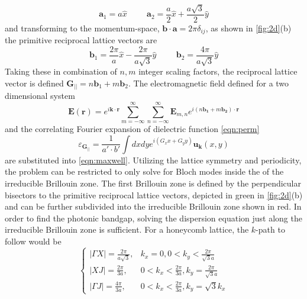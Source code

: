 \begin{equation}
	\boldsymbol{a}_1 = a\hat{x} \hspace{1cm} \boldsymbol{a}_2 = \frac{a}{2}\hat{x}+\frac{a\sqrt{3}}{2}\hat{y}
\end{equation}
and transforming to the momentum-space,  $\boldsymbol{b}\cdot\boldsymbol{a} = 2\pi\delta_{ij}$, as shown in \ref{fig:2d}(b) the primitive reciprocal lattice vectors are
\begin{equation}
	\boldsymbol{b}_1 = \frac{2\pi}{a}\hat{x}-\frac{2\pi}{a\sqrt{3}}\hat{y} \hspace{1cm} \boldsymbol{b}_2 =\frac{4\pi}{a\sqrt{3}}\hat{y} 
\end{equation}
Taking these in combination of $n, m$ integer scaling factors, the reciprocal lattice vector is defined $\boldsymbol{G_{||}} = n\boldsymbol{b}_1 + m\boldsymbol{b}_2$. 
The electromagnetic field defined for a two dimensional system
\begin{equation}
	\boldsymbol{E}(\boldsymbol{r}) = e^{i\boldsymbol{k}\cdot\boldsymbol{r}}
	\sum_{m=-\infty}^\infty\sum_{n=-\infty}^\infty\boldsymbol{E}_{m,n}
	e^{i(n\boldsymbol{b_1}+m\boldsymbol{b_2})\cdot\boldsymbol{r}}
		\label{eqn:2d_emf}
\end{equation}
and the correlating Fourier expansion of dielectric function \eqref{eqn:perm}
\begin{equation}
	\varepsilon_{\boldsymbol{G_{||}}} = \frac{1}{a'\cdot b'}\int dxdye^{i(G_xx + G_yy)}\boldsymbol{u_k}(x, y)  
	\label{eqn:2d_perm}
\end{equation}
are substituted into \eqref{eqn:maxwell}.  Utilizing the lattice symmetry and periodicity, the problem can be restricted to only solve for Bloch modes inside the of the irreducible Brillouin zone. The first Brillouin zone is defined by the perpendicular bisectors to the primitive reciprocal lattice vectors, depicted in green in \ref{fig:2d}(b) and can be further subdivided into the irreducible Brillouin zone shown in red.  In order to find the photonic bandgap, solving the dispersion equation just along the irreducible Brillouin zone is sufficient. For a honeycomb lattice, the $k$-path to follow would be
\begin{equation}	
	\begin{cases}
		|\Gamma X| = \frac{2\pi}{a\sqrt{3}}, &k_x=0, 0<k_y<\frac{2\pi}{\sqrt{3}a}\\
		|XJ| =  \frac{2\pi}{3a}, &0<k_x<\frac{2\pi}{3a}, k_y=\frac{2\pi}{\sqrt{3}a}\\
		|\Gamma J| = \frac{4\pi}{3a}, & 0<k_x<\frac{2\pi}{3a}, k_y=\sqrt{3}k_x
	\end{cases}
\end{equation}
